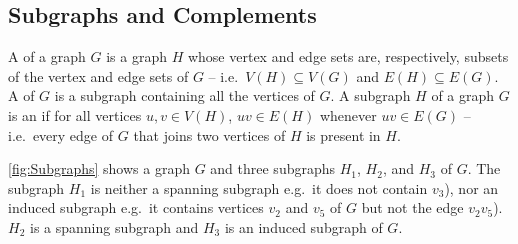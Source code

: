 \subsection{Subgraphs and Complements}\label{subsec:Subgraphs}

A  of a graph $G$ is a graph $H$ whose vertex and edge sets are, respectively, subsets of the vertex and edge sets of $G$ -- i.e.\ $V(H) \subseteq V(G)$ and $E(H) \subseteq E(G)$. A  of $G$ is a subgraph containing all the vertices of $G$. A subgraph $H$ of a graph $G$ is an  if for all vertices $u, v \in V(H)$, $uv \in E(H)$ whenever $uv \in E(G)$ -- i.e.\ every edge of $G$ that joins two vertices of $H$ is present in $H$.

\begin{Example}\label{ex:Subgraphs}
\cref{fig:Subgraphs} shows a graph $G$ and three subgraphs $H_1$, $H_2$, and $H_3$ of $G$. The subgraph $H_1$ is neither a spanning subgraph e.g.\ it does not contain $v_3$), nor an induced subgraph e.g.\ it contains vertices $v_2$ and $v_5$ of $G$ but not the edge $v_2 v_5$). $H_2$ is a spanning subgraph and $H_3$ is an induced subgraph of $G$.
\begin{figure}[!htbp]
\centering
{} \hfill

\end{figure}
\end{Example}
